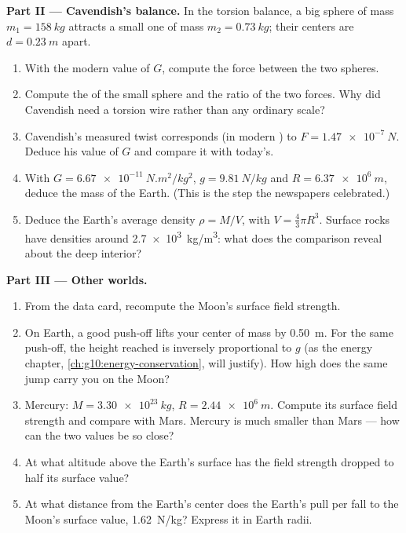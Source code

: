 \begin{problem}
\medskip
\noindent\textbf{Part II --- Cavendish's balance.}
In the torsion balance, a big sphere of mass $m_1 = \qty{158}{kg}$
attracts a small one of mass $m_2 = \qty{0.73}{kg}$; their centers are
$d = \qty{0.23}{m}$ apart.
\begin{enumerate}[resume]
  \item With the modern value of $G$, compute the force between the
        two spheres.
  \item Compute the  of the small sphere and the ratio of the
        two forces. Why did Cavendish need a torsion wire rather than
        any ordinary scale?
  \item Cavendish's measured twist corresponds (in modern ) to
        $F = \qty{1.47e-7}{N}$. Deduce his value of $G$ and compare it
        with today's.
  \item With $G = \qty{6.67e-11}{N.m^2/kg^2}$, $g = \qty{9.81}{N/kg}$
        and $R = \qty{6.37e6}{m}$, deduce the mass of the Earth. (This
        is the step the newspapers celebrated.)
  \item Deduce the Earth's average density $\rho = M / V$, with
        $V = \frac43 \pi R^3$. Surface rocks have densities around
        \qty{2.7e3}{kg/m^3}: what does the comparison reveal about the
        deep interior?
\end{enumerate}

\medskip
\noindent\textbf{Part III --- Other worlds.}
\begin{enumerate}[resume]
  \item From the data card, recompute the Moon's surface field
        strength.
  \item On Earth, a good push-off lifts your center of mass by
        \qty{0.50}{m}. For the same push-off, the height reached is
        inversely proportional to $g$ (as the energy chapter,
        \cref{ch:g10:energy-conservation}, will justify). How high
        does the same jump carry you on the Moon?
  \item Mercury: $M = \qty{3.30e23}{kg}$, $R = \qty{2.44e6}{m}$.
        Compute its surface field strength and compare with Mars.
        Mercury is much smaller than Mars --- how can the two values
        be so close?
  \item At what altitude above the Earth's surface has the field
        strength dropped to half its surface value?
  \item At what distance from the Earth's center does the Earth's pull
        per  fall to the Moon's surface value,
        \qty{1.62}{N/kg}? Express it in Earth radii.
\end{enumerate}


\end{problem}
